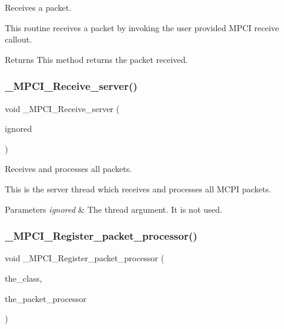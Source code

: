 Receives a packet. 

This routine receives a packet by invoking the user provided M\+P\+CI receive callout.

\begin{DoxyReturn}{Returns}
This method returns the packet received. 
\end{DoxyReturn}
\mbox{\label{group__RTEMSScoreMPCI_gaf232dadc9160e4b1c733906d3a6d1f57}} 
\subsubsection{\texorpdfstring{\_MPCI\_Receive\_server()}{\_MPCI\_Receive\_server()}}
{\footnotesize\ttfamily void \+\_\+\+M\+P\+C\+I\+\_\+\+Receive\+\_\+server (\begin{DoxyParamCaption}\item[{\mbox{\hyperlink{group__RTEMSScoreThread_gab56e437830bb9a4af5b27ac7ec503b6a}{Thread\+\_\+\+Entry\+\_\+numeric\+\_\+type}}}]{ignored }\end{DoxyParamCaption})}



Receives and processes all packets. 

This is the server thread which receives and processes all M\+C\+PI packets.


\begin{DoxyParams}{Parameters}
{\em ignored} & The thread argument. It is not used. \\
\hline
\end{DoxyParams}
\mbox{\label{group__RTEMSScoreMPCI_gac273d577d3696588f86f26b1910a2f9c}} 
\subsubsection{\texorpdfstring{\_MPCI\_Register\_packet\_processor()}{\_MPCI\_Register\_packet\_processor()}}
{\footnotesize\ttfamily void \+\_\+\+M\+P\+C\+I\+\_\+\+Register\+\_\+packet\+\_\+processor (\begin{DoxyParamCaption}\item[{\mbox{\hyperlink{group__RTEMSScoreMPPacket_gafed9717210f8917e5acb8e63f2c6bac3}{M\+P\+\_\+packet\+\_\+\+Classes}}}]{the\+\_\+class,  }\item[{\mbox{\hyperlink{group__RTEMSScoreMPCI_gafc97753e25c76740b182f3e8cdf74cc8}{M\+P\+C\+I\+\_\+\+Packet\+\_\+processor}}}]{the\+\_\+packet\+\_\+processor }\end{DoxyParamCaption})}



